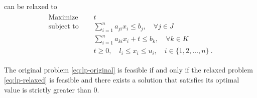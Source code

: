 \documentclass[runningheads]{llncs}
\begin{document}
can be relaxed to
\begin{align}
    \label{eq:lp-relaxed}
    \begin{split}
        \text{Maximize }   \quad & t                                                             \\
        \text{subject to } \quad & \sum_{i=1}^{n} a_{ji}x_{i} \le b_j, \quad \forall j \in J     \\
        \quad                    & \sum_{i=1}^{n} a_{ki}x_{i} + t \le b_k, \quad \forall k \in K \\
        & t \ge 0, \quad l_i \le x_i \le u_i,  \quad i \in \{1, 2, \ldots, n\} \ .
    \end{split}
\end{align}

\begin{theorem}
    \label{thm:lp-relaxed}
    The original problem \eqref{eq:lp-original} is feasible if and only if the relaxed problem \eqref{eq:lp-relaxed} is feasible and there exists a solution that satisfies its optimal value is strictly greater than $0$.
\end{theorem}
\end{document}
